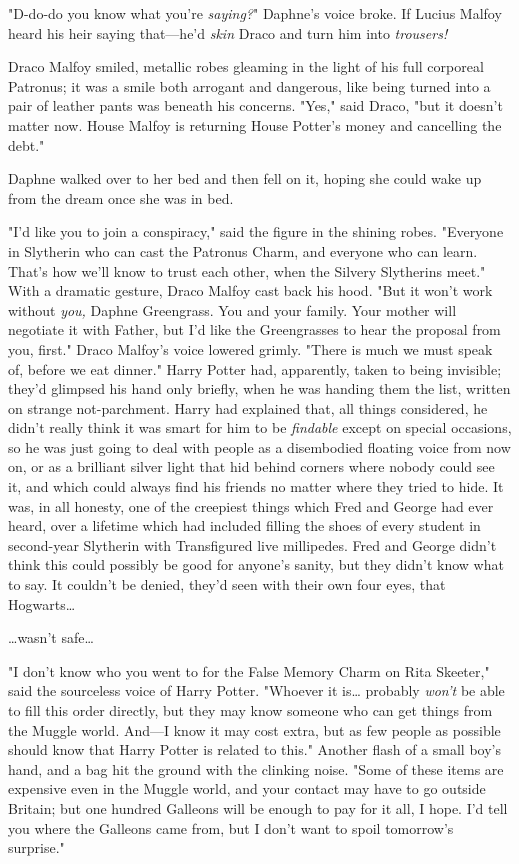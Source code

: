 "D-do-do you know what you're \emph{saying?}" Daphne's voice broke. If Lucius 
Malfoy heard his heir saying that---he'd \emph{skin} Draco and turn him into 
\emph{trousers!}

Draco Malfoy smiled, metallic robes gleaming in the light of his full corporeal 
Patronus; it was a smile both arrogant and dangerous, like being turned into a 
pair of leather pants was beneath his concerns. "Yes," said Draco, "but it 
doesn't matter now. House Malfoy is returning House Potter's money and 
cancelling the debt."

Daphne walked over to her bed and then fell on it, hoping she could wake up 
from the dream once she was in bed.

"I'd like you to join a conspiracy," said the figure in the shining robes. 
"Everyone in Slytherin who can cast the Patronus Charm, and everyone who can 
learn. That's how we'll know to trust each other, when the Silvery Slytherins 
meet." With a dramatic gesture, Draco Malfoy cast back his hood. "But it won't 
work without \emph{you,} Daphne Greengrass. You and your family. Your mother 
will negotiate it with Father, but I'd like the Greengrasses to hear the 
proposal from you, first." Draco Malfoy's voice lowered grimly. "There is much 
we must speak of, before we eat dinner."
\sbreak
Harry Potter had, apparently, taken to being invisible; they'd glimpsed his 
hand only briefly, when he was handing them the list, written on strange 
not-parchment. Harry had explained that, all things considered, he didn't 
really think it was smart for him to be \emph{findable} except on special 
occasions, so he was just going to deal with people as a disembodied floating 
voice from now on, or as a brilliant silver light that hid behind corners where 
nobody could see it, and which could always find his friends no matter where 
they tried to hide. It was, in all honesty, one of the creepiest things which 
Fred and George had ever heard, over a lifetime which had included filling the 
shoes of every student in second-year Slytherin with Transfigured live 
millipedes. Fred and George didn't think this could possibly be good for 
anyone's sanity, but they didn't know what to say. It couldn't be denied, 
they'd seen with their own four eyes, that Hogwarts{\ldots}

{\ldots}wasn't safe{\ldots}

"I don't know who you went to for the False Memory Charm on Rita Skeeter," said 
the sourceless voice of Harry Potter. "Whoever it is{\ldots} probably 
\emph{won't} be able to fill this order directly, but they may know someone who 
can get things from the Muggle world. And---I know it may cost extra, but as 
few people as possible should know that Harry Potter is related to this." 
Another flash of a small boy's hand, and a bag hit the ground with the clinking 
noise. "Some of these items are expensive even in the Muggle world, and your 
contact may have to go outside Britain; but one hundred Galleons will be enough 
to pay for it all, I hope. I'd tell you where the Galleons came from, but I 
don't want to spoil tomorrow's surprise."

